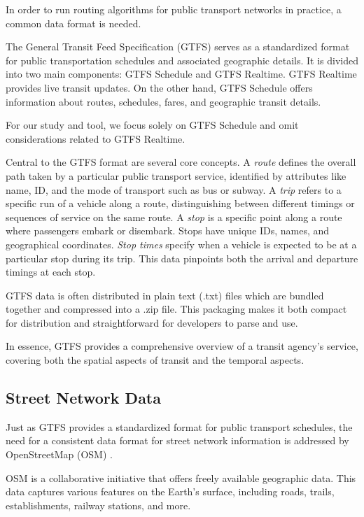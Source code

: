 In order to run routing algorithms for public transport networks in practice, a common data format is needed.

The General Transit Feed Specification (GTFS)  serves as a standardized format for public transportation schedules and associated geographic details.
It is divided into two main components: GTFS Schedule and GTFS Realtime.
GTFS Realtime provides live transit updates.
On the other hand, GTFS Schedule offers information about routes, schedules, fares, and geographic transit details.

For our study and tool, we focus solely on GTFS Schedule and omit considerations related to GTFS Realtime.

Central to the GTFS format are several core concepts.
A \textit{route} defines the overall path taken by a particular public transport service, identified by attributes like name, ID, and the mode of transport such as bus or subway.
A \textit{trip} refers to a specific run of a vehicle along a route, distinguishing between different timings or sequences of service on the same route.
A \textit{stop} is a specific point along a route where passengers embark or disembark.
Stops have unique IDs, names, and geographical coordinates.
\textit{Stop times} specify when a vehicle is expected to be at a particular stop during its trip.
This data pinpoints both the arrival and departure timings at each stop.

GTFS data is often distributed in plain text (.txt) files which are bundled together and compressed into a .zip file.
This packaging makes it both compact for distribution and straightforward for developers to parse and use.

In essence, GTFS provides a comprehensive overview of a transit agency's service, covering both the spatial aspects of transit and the temporal aspects.

\subsection{Street Network Data}
\label{subsec:street_network_data}

Just as GTFS provides a standardized format for public transport schedules, the need for a consistent data format for street network information is addressed by OpenStreetMap (OSM) .

OSM is a collaborative initiative that offers freely available geographic data.
This data captures various features on the Earth's surface, including roads, trails, establishments, railway stations, and more.

